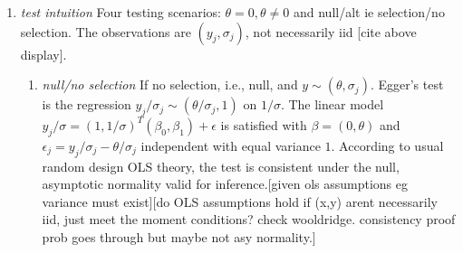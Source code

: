 \documentclass{article}
\newcommand{\gm}{\theta}
\renewcommand{\P}{P}
\newcommand{\sel}[1]{#1^*}
\begin{document}
\begin{enumerate}
  Selection on the raw value of the type $\{Z>cS\}$ affects the
  distribution of the precisions $S$ as well. The class of
  postselection distributions $\sel S$ is in principle only limited by
  the support of $Z$.
  Given $c\in\mathbbm{R}$, mean-zero $Z\sim f_Z$ and a density on
  $f$ on the nonnegative reals, such that $F_Z(cs)<1$ for any $s$ in
  the support of $f$. Then $f$ is a distribution for $\sel S$ given
  $\{Z>cS\}$ under the scale model [ref], when the unconditional distributional of $S$ is given by $g(s)=f(s)/(1-F_Z(cs))$. 
  \begin{proof}
    Since in that case,
    \begin{align}
      f_{\sel Z, \sel S}(a,b) &\propto f_{Z,S}(a,b)\{a>cb\}\\
                              &=f_Z(a)f_S(b)\{a>cb\}\\
                              &=f_Z(a)\{a>cb\}\frac{f(b)}{1-F_Z(cb)}
    \end{align}
    and integrating out $a$ gives $f_{\sel S}(b)=f(s)$.
  \end{proof}

  [may combine these small facts inone place. most are related to scale family]

  The conditional density of $\sel Y$ given $\sel S$ given a selection event $A\in\sigma(Y,S)$ is related to the conditional density of $Y$ given $S$ as
  \begin{align}
    f_{\sel Y\mid \sel S=b}(a) \propto f_{Y,S}(a,b)\mathbbm{1}_A(a,b)/\P(A) &\propto f_{Y\mid S=b}(a)\mathbbm{1}_A(a,b)/\P(A) \text{  i.e.,}\\
        \sel Y\mid (\sel S=\sel s) &\sim Y\mid (S=\sel s) \bigg| A
  \end{align}
  Ie, the two types of conditioning commute, as one can take select on
  $A$ then take the conditional density of $Y$ given $S$, or one can
  take the conditional density and then select on $A$. For example, if
  the observed data $(\sel Z,\sel S)$ comes from selection on the raw value, $\{Z>cS\}$, then one can compute the density of $\sel Z$ as $Z\mid Z>c\sel S$.
  
\item \emph{test intuition} Four testing scenarios: $\gm=0,\gm\neq 0$ and null/alt ie selection/no
  selection. The observations are $(y_j,\sigma_j)$, not necessarily iid [cite above display].

  \begin{enumerate}
  \item \emph{null/no selection} If no selection, i.e., null, and $y\sim (\gm,\sigma_j)$. Egger's
  test is the regression $y_j/\sigma_j\sim (\gm/\sigma_j,1)$ on
  $1/\sigma$. The linear model
  $y_j/\sigma = (1,1/\sigma)^T(\beta_0,\beta_1)+\epsilon$ is satisfied
  with $\beta=(0,\gm)$ and $\epsilon_j=y_j/\sigma_j-\gm/\sigma_j$
  independent with equal variance $1$. According to usual random
  design OLS theory, the test is consistent under the null, asymptotic
  normality valid for inference.[given ols assumptions eg variance
  must exist][do OLS assumptions hold if (x,y) arent necessarily iid,
  just meet the moment conditions? check wooldridge. consistency proof
  prob goes through but maybe not asy normality.]


\end{enumerate}
\end{enumerate}
\end{document}
